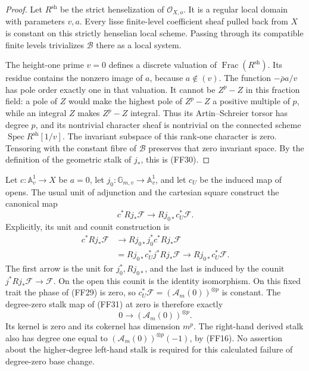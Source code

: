 \documentclass[11pt,a4paper]{article}
\theoremstyle{definition}
\begin{document}
\begin{proof}
Let \(R^{\mathrm{sh}}\) be the strict henselization of
\(\mathcal O_{X,o}\).  It is a regular local domain with parameters
\(v,a\).  Every lisse finite-level coefficient sheaf pulled back from
\(X\) is constant on this strictly henselian local scheme.  Passing
through its compatible finite levels trivializes \(\mathcal B\)
there as a local system.

The height-one prime \(v=0\) defines a discrete valuation of
\(\operatorname{Frac}(R^{\mathrm{sh}})\).  Its residue contains the
nonzero image of \(a\), because \(a\notin(v)\).  The function
\(-\bar\rho a/v\) has pole order exactly one in that valuation.
It cannot be \(Z^p-Z\) in this fraction field: a pole of \(Z\)
would make the highest pole of \(Z^p-Z\) a positive multiple of
\(p\), while an integral \(Z\) makes \(Z^p-Z\) integral.
Thus its Artin--Schreier torsor has degree \(p\), and its
nontrivial character sheaf is nontrivial on the connected scheme
\(\operatorname{Spec}R^{\mathrm{sh}}[1/v]\).
The invariant subspace of this rank-one character is zero.
Tensoring with the constant fibre of \(\mathcal B\) preserves that
zero invariant space.  By the definition of the geometric stalk of
\(j_*\), this is (FF30).
\end{proof}

Let \(c:\mathbb A^1_v\to X\) be \(a=0\), let
\(j_0:\mathbb G_{m,v}\to\mathbb A^1_v\), and let \(c_U\)
be the induced map of opens.  The usual unit of adjunction and the
cartesian square construct the canonical map
\[
 c^*Rj_*\mathcal F\longrightarrow Rj_{0*}c_U^*\mathcal F.
                                                               \tag{FF31}
\]
Explicitly, its unit and counit construction is
\[
 \begin{split}
 c^*Rj_*\mathcal F
 &\longrightarrow Rj_{0*}j_0^*c^*Rj_*\mathcal F\\
 &=Rj_{0*}c_U^*j^*Rj_*\mathcal F
       \longrightarrow Rj_{0*}c_U^*\mathcal F .
 \end{split}                                                  \tag{FF31a}
\]
The first arrow is the unit for \(j_0^*,Rj_{0*}\), and the last
is induced by the counit \(j^*Rj_*\mathcal F\to\mathcal F\).
On the open this counit is the identity isomorphism.
On this fixed trait the phase of (FF29) is zero, so
\(c_U^*\mathcal F=(\mathcal A_m(0))^{\otimes p}\) is constant.
The degree-zero stalk map of (FF31) at zero is therefore exactly
\[
       0\longrightarrow(\mathcal A_m(0))^{\otimes p}.   \tag{FF32}
\]
Its kernel is zero and its cokernel has dimension \(m^p\).
The right-hand derived stalk also has degree one equal to
\((\mathcal A_m(0))^{\otimes p}(-1)\), by (FF16).
No assertion about the higher-degree left-hand stalk is required
for this calculated failure of degree-zero base change.
\end{document}
